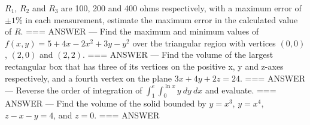 \(R_1\), \(R_2\) and \(R_3\) are 100, 200 and 400 ohms respectively, with a
maximum error of \(\pm 1\%\) in each measurement, estimate the maximum error in
the calculated value of \(R\).
===
ANSWER
---
Find the maximum and minimum values of \(f(x,y)=5+4x-2x^2+3y-y^2\) over the
triangular region with vertices \((0,0)\), \((2,0)\) and \((2,2)\).
===
ANSWER
---
Find the volume of the largest rectangular box that has three of its vertices on
the positive x, y and z-axes respectively, and a fourth vertex on the plane
\(3x+4y+2z=24\).
===
ANSWER
---
Reverse the order of integration of \(\int_1^e\int_0^{\ln x}y\ dy\ dx\) and
evaluate.
===
ANSWER
---
Find the volume of the solid bounded by \(y=x^3\), \(y=x^4\), \(z-x-y=4\), and
\(z=0\).
===
ANSWER

